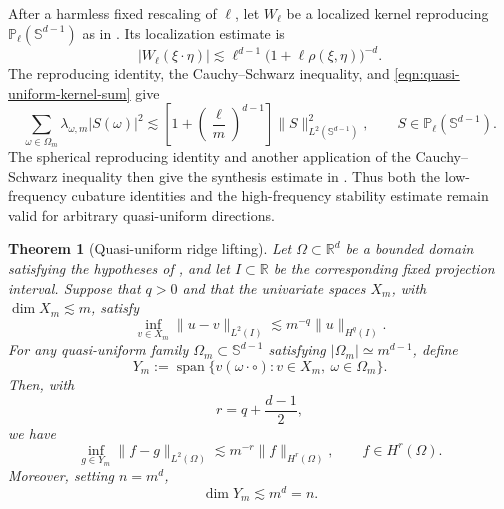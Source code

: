 \documentclass[10pt,a4paper]{amsart}
\numberwithin{equation}{section}
\newtheorem{theorem}{Theorem}
\def\RR{\mathbb{R}}
\def\SS{\mathbb{S}}
\begin{document}
After a harmless fixed rescaling of $\ell$, let $W_\ell$ be a localized kernel reproducing $\mathbb P_\ell(\SS^{d-1})$ as in \cite[Proposition~4.1]{petrushev1998approximation}. Its localization estimate is
$$
|W_\ell(\xi\cdot\eta)|
\lesssim
\ell^{d-1}\bigl(1+\ell\rho(\xi,\eta)\bigr)^{-d}.
$$
The reproducing identity, the Cauchy--Schwarz inequality, and \eqref{eqn:quasi-uniform-kernel-sum} give
\begin{equation}\label{eqn:quasi-uniform-mz-lifting}
\sum_{\omega\in\Omega_m}
\lambda_{\omega,m}|S(\omega)|^2
\lesssim
\left[1+\left(\frac{\ell}{m}\right)^{d-1}\right]
\|S\|_{L^2(\SS^{d-1})}^2,
\qquad
S\in\mathbb P_\ell(\SS^{d-1}).
\end{equation}
The spherical reproducing identity and another application of the Cauchy--Schwarz inequality then give the synthesis estimate in \cite[Lemma~4.4]{petrushev1998approximation}. Thus both the low-frequency cubature identities and the high-frequency stability estimate remain valid for arbitrary quasi-uniform directions.


\begin{theorem}[Quasi-uniform ridge lifting]\label{thm:quasi-uniform-ridge-lifting}
Let $\Omega\subset\RR^d$ be a bounded domain satisfying the hypotheses of \cite[Theorem~8.2]{petrushev1998approximation}, and let $I\subset\RR$ be the corresponding fixed projection interval. Suppose that $q>0$ and that the univariate spaces $X_m$, with $\dim X_m\lesssim m$, satisfy
\begin{equation}\label{eqn:univariate-assumption-appendix}
\inf_{v\in X_m}\|u-v\|_{L^2(I)}
\lesssim
m^{-q}\|u\|_{H^q(I)}.
\end{equation}
For any quasi-uniform family $\Omega_m\subset\SS^{d-1}$ satisfying $|\Omega_m|\simeq m^{d-1}$, define
$$
Y_m
:=
\operatorname{span}
\{v(\omega\cdot\circ):v\in X_m,\ \omega\in\Omega_m\}.
$$
Then, with
$$
r=q+\frac{d-1}{2},
$$
we have
\begin{equation}\label{eqn:quasi-uniform-lifting-rate}
\inf_{g\in Y_m}\|f-g\|_{L^2(\Omega)}
\lesssim
m^{-r}\|f\|_{H^r(\Omega)},
\qquad
f\in H^r(\Omega).
\end{equation}
Moreover, setting $n=m^d$,
$$
\dim Y_m\lesssim m^d=n.
$$
\end{theorem}
\end{document}
